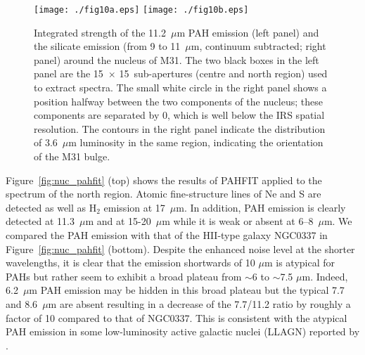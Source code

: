 \begin{figure}
\centering
\texttt{[image: ./fig10a.eps]}
\texttt{[image: ./fig10b.eps]}
\caption{
Integrated strength of the 11.2~$\mu$m PAH emission (left panel) and the silicate emission (from 9 to 11~$\mu$m, continuum subtracted; right panel) 
around the nucleus of M31. 
The  two black boxes in the left panel are the 15\arcsec\ $\times$ 15\arcsec\ sub-apertures (centre and north region) used to extract spectra.  
The small white circle in the right panel shows a position halfway between the two components of the nucleus; these
components are separated by 0, which is well below the IRS spatial resolution. The contours in the right panel indicate
the distribution of 3.6~$\mu$m luminosity in the same region, indicating the orientation of the M31 bulge.
}
\label{nuc11}
\end{figure}


Figure~\ref{fig:nuc_pahfit} (top) shows the results of PAHFIT applied to the spectrum of the north region. Atomic fine-structure lines of Ne and S are detected as well as H$_2$ emission at 17~$\mu$m. In addition, PAH emission is clearly detected at 11.3~$\mu$m and at 15-20~$\mu$m while it is weak or absent at 6--8~$\mu$m. We compared the PAH emission with that of the HII-type galaxy NGC0337 in Figure~\ref{fig:nuc_pahfit} (bottom). Despite the enhanced noise level at the shorter wavelengths, it is clear that the emission shortwards of 10 $\mu$m is atypical for PAHs but rather seem to exhibit a broad plateau from $\sim$6 to $\sim$7.5 $\mu$m. Indeed, 6.2~$\mu$m  PAH emission may be hidden in this broad plateau but the typical 7.7 and 8.6~$\mu$m are absent resulting in a decrease of the 7.7/11.2 ratio by roughly a factor of 10 compared to that of NGC0337. This is consistent with the atypical PAH emission in some low-luminosity active galactic nuclei (LLAGN) reported by \citet{Smith:2007lr}.

